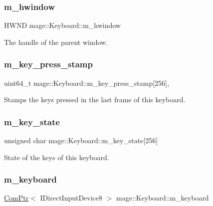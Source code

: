\subsubsection{\texorpdfstring{m\+\_\+hwindow}{m\_hwindow}}
{\footnotesize\ttfamily H\+W\+ND mage\+::\+Keyboard\+::m\+\_\+hwindow\hspace{0.3cm}{\ttfamily [private]}}

The handle of the parent window. \hypertarget{classmage_1_1_keyboard_a8eb4ce7e4e2395bb27d2ac9236655335}{}\label{classmage_1_1_keyboard_a8eb4ce7e4e2395bb27d2ac9236655335} 
\subsubsection{\texorpdfstring{m\+\_\+key\+\_\+press\+\_\+stamp}{m\_key\_press\_stamp}}
{\footnotesize\ttfamily uint64\+\_\+t mage\+::\+Keyboard\+::m\+\_\+key\+\_\+press\+\_\+stamp\mbox{[}256\mbox{]}\hspace{0.3cm}{\ttfamily [mutable]}, {\ttfamily [private]}}

Stamps the keys pressed in the last frame of this keyboard. \hypertarget{classmage_1_1_keyboard_a7499df459499f5addd50507ea1e2358c}{}\label{classmage_1_1_keyboard_a7499df459499f5addd50507ea1e2358c} 
\subsubsection{\texorpdfstring{m\+\_\+key\+\_\+state}{m\_key\_state}}
{\footnotesize\ttfamily unsigned char mage\+::\+Keyboard\+::m\+\_\+key\+\_\+state\mbox{[}256\mbox{]}\hspace{0.3cm}{\ttfamily [private]}}

State of the keys of this keyboard. \hypertarget{classmage_1_1_keyboard_a992b8b8caf0d858163e5e9af04302324}{}\label{classmage_1_1_keyboard_a992b8b8caf0d858163e5e9af04302324} 
\subsubsection{\texorpdfstring{m\+\_\+keyboard}{m\_keyboard}}
{\footnotesize\ttfamily \hyperlink{namespacemage_ae74f374780900893caa5555d1031fd79}{Com\+Ptr}$<$ I\+Direct\+Input\+Device8 $>$ mage\+::\+Keyboard\+::m\+\_\+keyboard\hspace{0.3cm}{\ttfamily [private]}}

